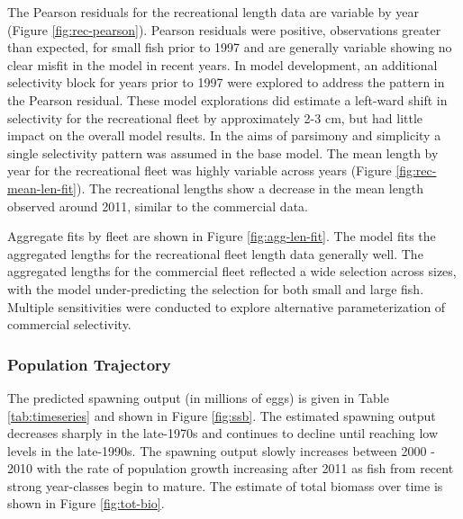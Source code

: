 \documentclass[11pt,
  english,
  a4paper,
]{article}
\begin{document}
\leavevmode\tagmcend\tagstructend\par


The Pearson residuals for the recreational length data are variable by year (Figure \ref{fig:rec-pearson}). Pearson residuals were positive, observations greater than expected, for small fish prior to 1997 and are generally variable showing no clear misfit in the model in recent years. In model development, an additional selectivity block for years prior to 1997 were explored to address the pattern in the Pearson residual. These model explorations did estimate a left-ward shift in selectivity for the recreational fleet by approximately 2-3 cm, but had little impact on the overall model results. In the aims of parsimony and simplicity a single selectivity pattern was assumed in the base model. The mean length by year for the recreational fleet was highly variable across years (Figure \ref{fig:rec-mean-len-fit}). The recreational lengths show a decrease in the mean length observed around 2011, similar to the commercial data.

\leavevmode\tagmcend\tagstructend\par


Aggregate fits by fleet are shown in Figure \ref{fig:agg-len-fit}. The model fits the aggregated lengths for the recreational fleet length data generally well. The aggregated lengths for the commercial fleet reflected a wide selection across sizes, with the model under-predicting the selection for both small and large fish. Multiple sensitivities were conducted to explore alternative parameterization of commercial selectivity.

\leavevmode\tagmcend\tagstructend\par


\hypertarget{population-trajectory}{%
\subsubsection{Population Trajectory}\label{population-trajectory}}

\leavevmode\tagmcend\tagstructend


The predicted spawning output (in millions of eggs) is given in Table \ref{tab:timeseries} and shown in Figure \ref{fig:ssb}. The estimated spawning output decreases sharply in the late-1970s and continues to decline until reaching low levels in the late-1990s. The spawning output slowly increases between 2000 - 2010 with the rate of population growth increasing after 2011 as fish from recent strong year-classes begin to mature. The estimate of total biomass over time is shown in Figure \ref{fig:tot-bio}.
\end{document}
